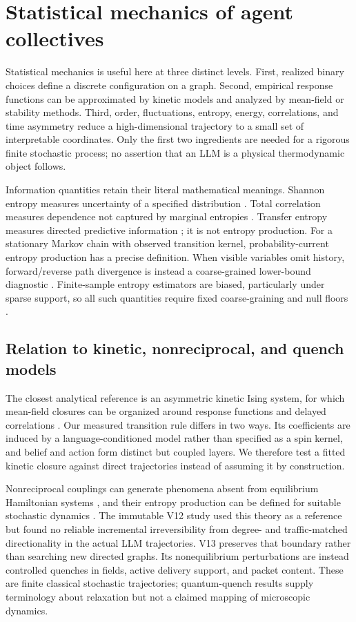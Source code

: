\documentclass[12pt]{article}
\begin{document}
\section{Statistical mechanics of agent collectives}

Statistical mechanics is useful here at three distinct levels. First, realized
binary choices define a discrete configuration on a graph. Second, empirical
response functions can be approximated by kinetic models and analyzed by
mean-field or stability methods. Third, order, fluctuations, entropy, energy,
correlations, and time asymmetry reduce a high-dimensional trajectory to a
small set of interpretable coordinates. Only the first two ingredients are
needed for a rigorous finite stochastic process; no assertion that an LLM is a
physical thermodynamic object follows.

Information quantities retain their literal mathematical meanings. Shannon
entropy measures uncertainty of a specified distribution \cite{shannon1948}.
Total correlation measures dependence not captured by marginal entropies
\cite{watanabe1960}. Transfer entropy measures directed predictive information
\cite{schreiber2000}; it is not entropy production. For a stationary Markov
chain with observed transition kernel, probability-current entropy production
has a precise definition. When visible variables omit history, forward/reverse
path divergence is instead a coarse-grained lower-bound diagnostic
\cite{roldan2012,kawaguchi2013}. Finite-sample entropy estimators are biased,
particularly under sparse support, so all such quantities require fixed
coarse-graining and null floors \cite{paninski2003}.

\subsection{Relation to kinetic, nonreciprocal, and quench models}

The closest analytical reference is an asymmetric kinetic Ising system, for
which mean-field closures can be organized around response functions and
delayed correlations \cite{aguilera2021}. Our measured transition rule differs
in two ways. Its coefficients are induced by a language-conditioned model
rather than specified as a spin kernel, and belief and action form distinct
but coupled layers. We therefore test a fitted kinetic closure against direct
trajectories instead of assuming it by construction.

Nonreciprocal couplings can generate phenomena absent from equilibrium
Hamiltonian systems \cite{fruchart2021}, and their entropy production can be
defined for suitable stochastic dynamics \cite{zhang2023}. The immutable V12
study used this theory as a reference but found no reliable incremental
irreversibility from degree- and traffic-matched directionality in the actual
LLM trajectories. V13 preserves that boundary rather than searching new
directed graphs. Its nonequilibrium perturbations are instead controlled
quenches in fields, active delivery support, and packet content. These are
finite classical stochastic trajectories; quantum-quench results
\cite{calabrese2006} supply terminology about relaxation but not a claimed
mapping of microscopic dynamics.
\end{document}
